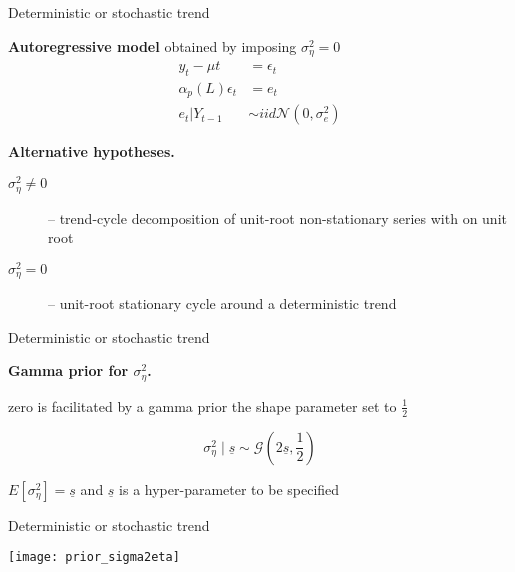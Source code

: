\documentclass[notes,blackandwhite,mathsans,usenames,dvipsnames]{beamer}
\begin{document}
\begin{frame}{Deterministic or stochastic trend}


\bigskip\textbf{Autoregressive model} obtained by imposing $\sigma_\eta^2=0$
$$
\begin{array}{rl}
y_t -\mu t &= \epsilon_t\\[1ex]
\alpha_p(L)\epsilon_t &=  e_t\\[1ex]
e_t |Y_{t-1} &\sim iid\mathcal{N}\left(0,\sigma_e^2\right)
\end{array}
$$

\textbf{Alternative hypotheses.}

\begin{description}
\item[$\sigma_\eta^2\neq 0$] {\color{mcxs2}-- trend-cycle decomposition of unit-root non-stationary series with on unit root}

\smallskip\item[$\sigma_\eta^2=0$] {\color{mcxs2}-- unit-root stationary cycle around a deterministic trend}
\end{description}


\end{frame}






\begin{frame}{Deterministic or stochastic trend}


\textbf{Gamma prior for $\sigma^2_\eta$.}

 zero {\color{mcxs2}is facilitated by a gamma prior the shape parameter set to} $\frac{1}{2}$ 

$$\sigma_\eta^2\mid \underline{s}\sim\mathcal{G}\left(2\underline{s}, \frac{1}{2}\right)$$ 

 $E[\sigma_\eta^2] = \underline{s}$ {\color{mcxs2}and} $\underline{s}$ {\color{mcxs2}is a hyper-parameter to be specified}

\bigskip{\color{mcxs2}}

\end{frame}



\begin{frame}{Deterministic or stochastic trend}

\texttt{[image: prior\_sigma2eta]}

\end{frame}
\end{document}
